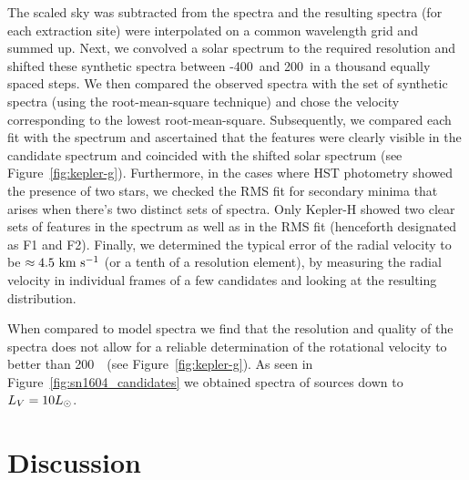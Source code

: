 \documentclass[preprint2]{aastex}
\begin{document}
The scaled sky was subtracted from the spectra and the resulting spectra (for each extraction site) were interpolated on a common wavelength grid and summed up. Next, we convolved a solar spectrum to the required resolution and shifted these synthetic spectra between -400\kms\ and 200\kms\ in a thousand equally spaced steps. We then compared the observed spectra with the set of synthetic spectra (using the root-mean-square technique) and chose the velocity corresponding to the lowest root-mean-square. Subsequently, we compared each fit with the spectrum and ascertained that the  features were clearly visible in the candidate spectrum and coincided with the shifted solar spectrum (see Figure~\ref{fig:kepler-g}). Furthermore, in the cases where HST photometry showed the presence of two stars, we checked the RMS fit for secondary minima that arises when there's two distinct sets of spectra. Only Kepler-H showed two clear sets of  features in the spectrum as well as in the RMS fit (henceforth designated as F1 and F2). Finally, we determined the typical error of the radial velocity to be $\approx4.5~\textrm{km}~\textrm{s}^{-1}$  (or a tenth of a resolution element), by measuring the radial velocity in individual frames of a few candidates and looking at the resulting distribution. 

When compared to model spectra we find that the resolution and quality of the spectra does not allow for a reliable determination of the rotational velocity to better than 200~\kms\ (see Figure~\ref{fig:kepler-g}). 
As seen in Figure~\ref{fig:sn1604_candidates} we obtained spectra of sources down to $L_V = 10 \hbox{$L_{\odot}$}$.





\section{Discussion}
\label{sec:discussion}
\end{document}
